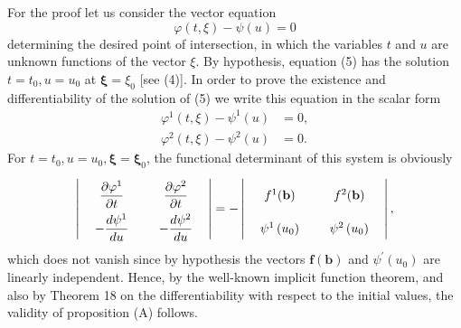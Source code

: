 \documentclass[10pt,a5paper]{book}
\makeatletter
\theoremstyle{plain}
\theoremstyle{definition}
\theoremstyle{remark}
\renewenvironment{proof}[1][\proofname]{\par
  \pushQED{\qed}%
  \normalfont\topsep6\p@\@plus6\p@\relax
  \trivlist
  \item\relax{\itshape #1\@addpunct{.}}\hspace\labelsep\ignorespaces
}{\popQED\endtrivlist\@endpefalse}
\makeatother
\begin{document}
\begin{proof}
For the proof let us consider the vector equation
\begin{equation*}
\varphi(t, \xi)-\psi(u)=0 \tag{5}
\end{equation*}
determining the desired point of intersection, in which the variables $t$ and $u$ are unknown functions of the vector $\xi$. By hypothesis, equation (5) has the solution $t=t_{0}, u=u_{0}$ at $\boldsymbol{\xi}=\xi_{0}$ [see (4)]. In order to prove the existence and differentiability of the solution of (5) we write this equation in the scalar form
\[
\begin{aligned}
\varphi^{1}(t, \xi)-\psi^{1}(u) & =0, \\
\varphi^{2}(t, \xi)-\psi^{2}(u) & =0 .
\end{aligned}
\]
For $t=t_{0}, u=u_{0}, \boldsymbol{\xi}=\boldsymbol{\xi}_{0}$, the functional determinant of this system is obviously
\[
\renewcommand{\arraystretch}{2.2}%
\setlength{\arraycolsep}{12pt}%
\left|\begin{array}{cc}
\dfrac{\partial \varphi^{1}}{\partial t} & \dfrac{\partial \varphi^{2}}{\partial t} \\
-\dfrac{d \psi^{1}}{d u} & -\dfrac{d \psi^{2}}{d u}
\end{array}\right|
=-\left|\begin{array}{cc}
f^{1}(\mathbf{b}) & f^{2}(\mathbf{b}) \\
\psi^{1}\left(u_{0}\right) & \psi^{2}\left(u_{0}\right)
\end{array}\right|,
\]
which does not vanish since by hypothesis the vectors $\mathbf{f}(\mathbf{b})$ and $\psi^{\prime}\left(u_{0}\right)$ are linearly independent. Hence, by the well-known implicit function theorem, and also by Theorem 18 on the differentiability with respect to the initial values, the validity of proposition (A) follows.


\end{proof}
\end{document}
